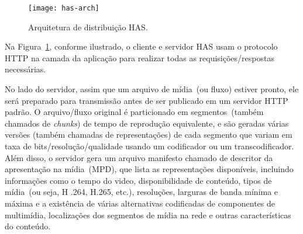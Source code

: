 \begin{figure}[htb]
  \centering
  \texttt{[image: has-arch]}
  \caption{Arquitetura de distribuição HAS.}
  \label{fig:has-arch}
\end{figure}
%

Na Figura~\ref{fig:has-arch}, conforme ilustrado, o cliente e servidor HAS usam o protocolo HTTP na camada da aplicação para realizar todas as requisições/respostas necessárias. 

No lado do servidor, assim que um arquivo de mídia~(ou fluxo) estiver pronto, ele será preparado para transmissão antes de ser publicado em um servidor HTTP padrão. O arquivo/fluxo original é particionado em segmentos~(também chamados de \textit{chunks}) de tempo de reprodução equivalente, e são geradas várias versões (também chamadas de representações) de cada segmento que variam em taxa de bits/resolução/qualidade usando um codificador ou um transcodificador. 
Além disso, o servidor gera um arquivo manifesto chamado de descritor da apresentação na mídia~(MPD), que lista as representações disponíveis, incluindo informações como o tempo do video, disponibilidade de conteúdo, tipos de mídia~(ou seja, H .264, H.265, etc.), resoluções, larguras de banda mínima e máxima e a existência de várias alternativas codificadas de componentes de multimídia, localizações dos segmentos de mídia na rede e outras características do conteúdo.

